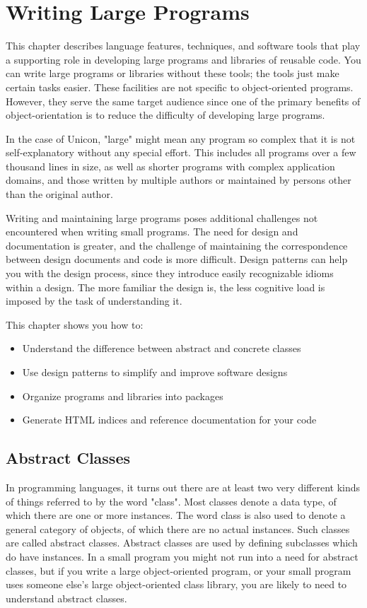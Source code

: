 \chapter{Writing Large Programs}

This chapter describes language features, techniques, and software tools
that play a supporting role in developing large programs and libraries
of reusable code. You can write large programs or libraries without
these tools; the tools just make certain tasks easier. These facilities
are not specific to object-oriented programs. However, they serve the
same target audience since one of the primary benefits of
object-orientation is to reduce the difficulty of developing large
programs.

In the case of Unicon, "large" might mean
any program so complex that it is not self-explanatory without any
special effort. This includes all programs over a few thousand lines in
size, as well as shorter programs with complex application domains, and
those written by multiple authors or maintained by persons other than
the original author.

Writing and maintaining large programs poses additional challenges not
encountered when writing small programs. The need for design and
documentation is greater, and the challenge of maintaining the
correspondence between design documents and code is more difficult.
Design patterns can help you with the design process, since they
introduce easily recognizable idioms within a design. The more familiar
the design is, the less cognitive load is imposed by the task of
understanding it.

This chapter shows you how to:

\begin{itemize}
\item Understand the difference between abstract and concrete classes
\item Use design patterns to simplify and improve software designs
\item Organize programs and libraries into packages
\item Generate HTML indices and reference documentation for your code
\end{itemize}

\section{Abstract Classes}

In programming languages, it turns out there are at least two very
different kinds of things referred to by the word
"class". Most classes denote a data type,
of which there are one or more instances. The word class is also used
to denote a general category of objects, of which there are no actual
instances. Such classes are called abstract
classes. Abstract classes are used by defining
subclasses which do have instances. In a small program you might not
run into a need for abstract classes, but if you write a large
object-oriented program, or your small program uses someone
else's large object-oriented class library, you are
likely to need to understand abstract classes.

